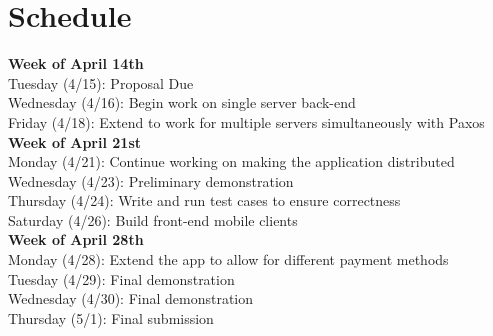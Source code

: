 \documentclass[12pt]{article}
\begin{document}
\section{Schedule}

\textbf{Week of April 14th}\\
Tuesday (4/15): Proposal Due\\
Wednesday (4/16): Begin work on single server back-end\\
Friday (4/18): Extend to work for multiple servers simultaneously with Paxos\\

\textbf{Week of April 21st}\\
Monday (4/21): Continue working on making the application distributed\\
Wednesday (4/23): Preliminary demonstration\\
Thursday (4/24): Write and run test cases to ensure correctness\\
Saturday (4/26): Build front-end mobile clients\\

\textbf{Week of April 28th}\\
Monday (4/28): Extend the app to allow for different payment methods\\
Tuesday (4/29): Final demonstration\\
Wednesday (4/30): Final demonstration\\
Thursday (5/1): Final submission 
\end{document}
